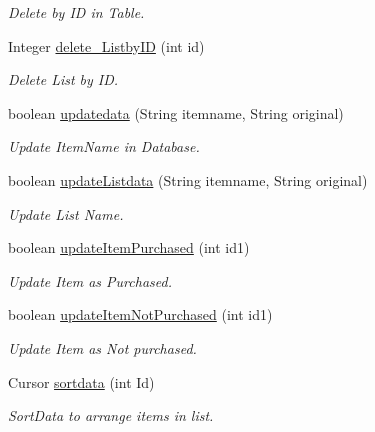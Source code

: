 \begin{DoxyCompactItemize}
\begin{DoxyCompactList}\small\item\em Delete by ID in Table. \end{DoxyCompactList}\item 
Integer \hyperlink{classcom_1_1example_1_1santh_1_1shoppinglist_1_1_data_base_manager_a9d3b7935c938547342a5901f7b36f525}{delete\+\_\+\+Listby\+ID} (int id)
\begin{DoxyCompactList}\small\item\em Delete List by ID. \end{DoxyCompactList}\item 
boolean \hyperlink{classcom_1_1example_1_1santh_1_1shoppinglist_1_1_data_base_manager_a68c423e2ef83ec63f0836f62637794fe}{updatedata} (String itemname, String original)
\begin{DoxyCompactList}\small\item\em Update Item\+Name in Database. \end{DoxyCompactList}\item 
boolean \hyperlink{classcom_1_1example_1_1santh_1_1shoppinglist_1_1_data_base_manager_a0d54793ae4494224e8c80bb69dd03ae1}{update\+Listdata} (String itemname, String original)
\begin{DoxyCompactList}\small\item\em Update List Name. \end{DoxyCompactList}\item 
boolean \hyperlink{classcom_1_1example_1_1santh_1_1shoppinglist_1_1_data_base_manager_acc9756c58ed8994133dff1241a62f896}{update\+Item\+Purchased} (int id1)
\begin{DoxyCompactList}\small\item\em Update Item as Purchased. \end{DoxyCompactList}\item 
boolean \hyperlink{classcom_1_1example_1_1santh_1_1shoppinglist_1_1_data_base_manager_a14844033da2d6593a848a377a21d96a3}{update\+Item\+Not\+Purchased} (int id1)
\begin{DoxyCompactList}\small\item\em Update Item as Not purchased. \end{DoxyCompactList}\item 
Cursor \hyperlink{classcom_1_1example_1_1santh_1_1shoppinglist_1_1_data_base_manager_a22a3d9161c068013b59434ce07511985}{sortdata} (int Id)
\begin{DoxyCompactList}\small\item\em Sort\+Data to arrange items in list. \end{DoxyCompactList}\item 

\end{DoxyCompactItemize}
